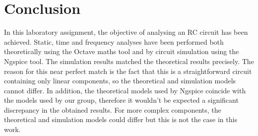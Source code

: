 \section{Conclusion}
\label{sec:conclusion}

In this laboratory assignment, the objective of analysing an RC circuit has been achieved. Static, time and frequency analyses have been performed both theoretically using the Octave maths tool and by circuit simulation using the Ngspice tool. The simulation results matched the theoretical results precisely. The reason for this near perfect match is the fact that this is a straightforward circuit containing only linear components, so the theoretical and simulation models cannot differ. In addition, the theoretical models used by Ngspice coincide with the models used by our group, therefore it wouldn't be expected a significant discrepancy in the obtained results. For more complex components, the theoretical and simulation models could differ but this is not the case in this work.




